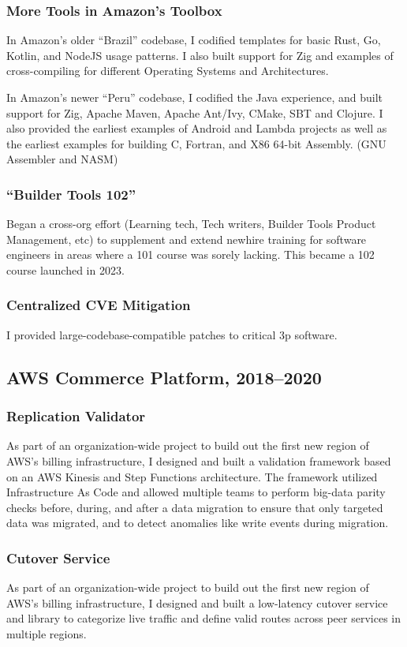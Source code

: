 \documentclass[9pt]{extarticle}
\begin{document}
\subsubsection{More Tools in Amazon's Toolbox}
In Amazon's older ``Brazil'' codebase, I codified templates for basic Rust, Go,
Kotlin, and NodeJS usage patterns. I also built support for Zig and examples
of cross-compiling for different Operating Systems and Architectures.

In Amazon's newer ``Peru'' codebase, I codified the Java experience, and built
support for Zig, Apache Maven, Apache Ant/Ivy, CMake, SBT and Clojure. I also
provided the earliest examples of Android and Lambda projects as well as the
earliest examples for building C, Fortran, and X86 64-bit Assembly. (GNU
Assembler and NASM)

\subsubsection{``Builder Tools 102''}
Began a cross-org effort (Learning tech, Tech writers, Builder Tools Product
Management, etc) to supplement and extend newhire training for software
engineers in areas where a 101 course was sorely lacking. This became a 102
course launched in 2023.

\subsubsection{Centralized CVE Mitigation}
I provided large-codebase-compatible patches to critical 3p software.

\subsection{AWS Commerce Platform, 2018--2020}

\subsubsection{Replication Validator}
As part of an organization-wide project to build out the first new region of
AWS's billing infrastructure, I designed and built a validation framework based
on an AWS Kinesis and Step Functions architecture. The framework utilized
Infrastructure As Code and allowed multiple teams to perform big-data parity
checks before, during, and after a data migration to ensure that only targeted
data was migrated, and to detect anomalies like write events during migration.

\subsubsection{Cutover Service}
As part of an organization-wide project to build out the first new region of
AWS's billing infrastructure, I designed and built a low-latency cutover service
and library to categorize live traffic and define valid routes across peer
services in multiple regions.
\end{document}
